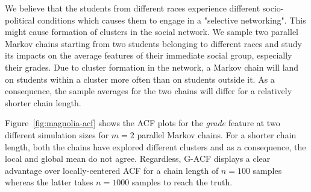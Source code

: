 \documentclass[11pt]{article}
\theoremstyle{remark}
\begin{document}

We believe that the students from different races experience different socio-political conditions which causes them to engage in a "selective networking". This might cause formation of clusters in the social network. We sample two parallel Markov chains starting from two students belonging to different races and study its impacts on the average features of their immediate social group, especially their grades. Due to cluster formation in the network, a Markov chain will land on students within a cluster more often than on students outside it. As a consequence, the sample averages for the two chains will differ for a relatively shorter chain length. 

Figure~\ref{fig:magnolia-acf} shows the ACF plots for the \textit{grade} feature at two different simulation sizes for $m=2$ parallel Markov chains. For a shorter chain length, both the chains have explored different clusters and as a consequence, the local and global mean do not agree. Regardless, G-ACF displays a clear advantage over locally-centered ACF for a chain length of $n=100$ samples whereas the latter takes $n=1000$ samples to reach the truth. 



\singlespacing


\end{document}
